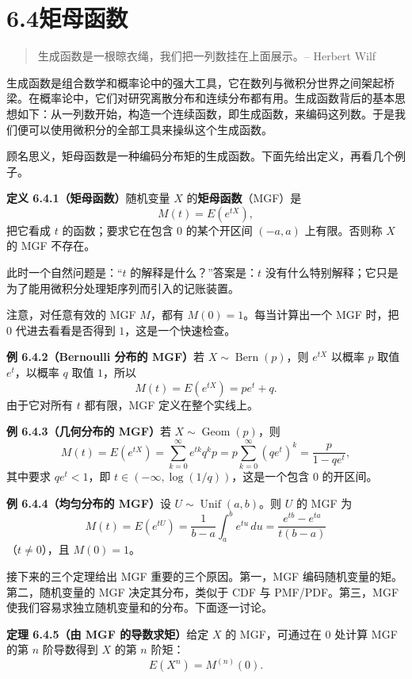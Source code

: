 \documentclass[UTF8, 12pt, fontset=fandol, oneside]{ctexart}
\begin{document}
\section*{6.4\quad 矩母函数}

\begin{quote}
生成函数是一根晾衣绳，我们把一列数挂在上面展示。-- Herbert Wilf
\end{quote}

生成函数是组合数学和概率论中的强大工具，它在数列与微积分世界之间架起桥梁。在概率论中，它们对研究离散分布和连续分布都有用。生成函数背后的基本思想如下：从一列数开始，构造一个连续函数，即生成函数，来编码这列数。于是我们便可以使用微积分的全部工具来操纵这个生成函数。

顾名思义，矩母函数是一种编码分布矩的生成函数。下面先给出定义，再看几个例子。

\noindent\textbf{定义 6.4.1（矩母函数）}\quad 随机变量 $X$ 的\textbf{矩母函数}（MGF）是
\[
  M(t)=E(e^{tX}),
\]
把它看成 $t$ 的函数；要求它在包含 $0$ 的某个开区间 $(-a,a)$ 上有限。否则称 $X$ 的 MGF 不存在。

此时一个自然问题是：“$t$ 的解释是什么？”答案是：$t$ 没有什么特别解释；它只是为了能用微积分处理矩序列而引入的记账装置。

注意，对任意有效的 MGF $M$，都有 $M(0)=1$。每当计算出一个 MGF 时，把 $0$ 代进去看看是否得到 $1$，这是一个快速检查。

\noindent\textbf{例 6.4.2（Bernoulli 分布的 MGF）}\quad 若 $X\sim\operatorname{Bern}(p)$，则 $e^{tX}$ 以概率 $p$ 取值 $e^t$，以概率 $q$ 取值 $1$，所以
\[
  M(t)=E(e^{tX})=pe^t+q.
\]
由于它对所有 $t$ 都有限，MGF 定义在整个实线上。

\noindent\textbf{例 6.4.3（几何分布的 MGF）}\quad 若 $X\sim\operatorname{Geom}(p)$，则
\[
  M(t)=E(e^{tX})
  =
  \sum_{k=0}^{\infty}e^{tk}q^kp
  =
  p\sum_{k=0}^{\infty}(qe^t)^k
  =
  \frac{p}{1-qe^t},
\]
其中要求 $qe^t<1$，即 $t\in(-\infty,\log(1/q))$，这是一个包含 $0$ 的开区间。

\noindent\textbf{例 6.4.4（均匀分布的 MGF）}\quad 设 $U\sim\operatorname{Unif}(a,b)$。则 $U$ 的 MGF 为
\[
  M(t)=E(e^{tU})
  =
  \frac1{b-a}\int_a^b e^{tu}\,du
  =
  \frac{e^{tb}-e^{ta}}{t(b-a)}
\]
（$t\ne0$），且 $M(0)=1$。

接下来的三个定理给出 MGF 重要的三个原因。第一，MGF 编码随机变量的矩。第二，随机变量的 MGF 决定其分布，类似于 CDF 与 PMF/PDF。第三，MGF 使我们容易求独立随机变量和的分布。下面逐一讨论。

\noindent\textbf{定理 6.4.5（由 MGF 的导数求矩）}\quad 给定 $X$ 的 MGF，可通过在 $0$ 处计算 MGF 的第 $n$ 阶导数得到 $X$ 的第 $n$ 阶矩：
\[
  E(X^n)=M^{(n)}(0).
\]
\end{document}
